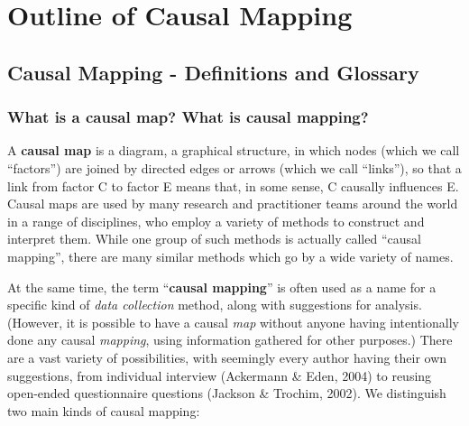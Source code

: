 \documentclass[
]{book}
\begin{document}
\hypertarget{part-outline-of-causal-mapping}{%
\part{Outline of Causal Mapping}\label{part-outline-of-causal-mapping}}

\hypertarget{glossary}{%
\chapter{Causal Mapping - Definitions and Glossary}\label{glossary}}

\hypertarget{what-is-a-causal-map-what-is-causal-mapping}{%
\section{What is a causal map? What is causal mapping?}\label{what-is-a-causal-map-what-is-causal-mapping}}

A \textbf{causal map} is a diagram, a graphical structure, in which nodes (which we call ``factors'') are joined by directed edges or arrows (which we call ``links''), so that a link from factor C to factor E means that, in some sense, C causally influences E. Causal maps are used by many research and practitioner teams around the world in a range of disciplines, who employ a variety of methods to construct and interpret them. While one group of such methods is actually called ``causal mapping'', there are many similar methods which go by a wide variety of names.

At the same time, the term ``\textbf{causal mapping}'' is often used as a name for a specific kind of \emph{data collection} method, along with suggestions for analysis. (However, it is possible to have a causal \emph{map} without anyone having intentionally done any causal \emph{mapping}, using information gathered for other purposes.) There are a vast variety of possibilities, with seemingly every author having their own suggestions, from individual interview (Ackermann \& Eden, 2004) to reusing open-ended questionnaire questions (Jackson \& Trochim, 2002). We distinguish two main kinds of causal mapping:
\end{document}
